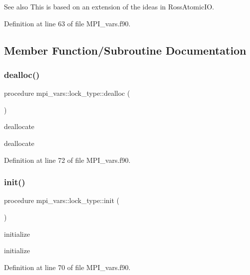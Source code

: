 \begin{DoxySeeAlso}{See also}
This is based on an extension of the ideas in {\ttfamily Ross\+Atomic\+IO}. 
\end{DoxySeeAlso}


Definition at line 63 of file M\+P\+I\+\_\+vars.\+f90.



\subsection{Member Function/\+Subroutine Documentation}
\mbox{\label{structmpi__vars_1_1lock__type_a3b633d333ce2963fbe05e99badd00606}} 
\subsubsection{\texorpdfstring{dealloc()}{dealloc()}}
{\footnotesize\ttfamily procedure mpi\+\_\+vars\+::lock\+\_\+type\+::dealloc (\begin{DoxyParamCaption}{ }\end{DoxyParamCaption})}



deallocate 

deallocate 

Definition at line 72 of file M\+P\+I\+\_\+vars.\+f90.

\mbox{\label{structmpi__vars_1_1lock__type_abb38fce763fc0925e6bb7d69162e68b0}} 
\subsubsection{\texorpdfstring{init()}{init()}}
{\footnotesize\ttfamily procedure mpi\+\_\+vars\+::lock\+\_\+type\+::init (\begin{DoxyParamCaption}{ }\end{DoxyParamCaption})}



initialize 

initialize 

Definition at line 70 of file M\+P\+I\+\_\+vars.\+f90.



